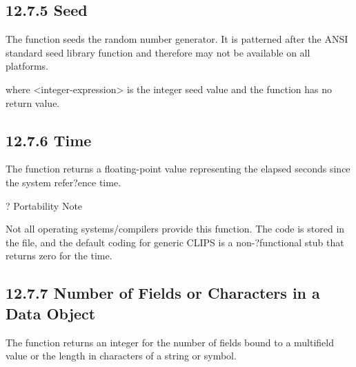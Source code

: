\documentclass[letterpaper,10pt,english]{sphinxmanual}
\begin{document}
\subsection{12.7.5 Seed}
\label{\detokenize{actions:seed}}
The  function seeds the random number generator. It is patterned
after the ANSI standard seed library function and therefore may not be
available on all platforms.


\begin{sphinxVerbatim}[commandchars=\\\{\}]
 
\end{sphinxVerbatim}

where \textless{}integer-expression\textgreater{} is the integer seed value and the function
has no return value.


\subsection{12.7.6 Time}
\label{\detokenize{actions:time}}
The  function returns a floating-point value representing the
elapsed seconds since the system refer?ence time.


\begin{sphinxVerbatim}[commandchars=\\\{\}]
\end{sphinxVerbatim}

? Portability Note

Not all operating systems/compilers provide this function. The code is
stored in the  file, and the default coding for generic
CLIPS is a non-?functional stub that returns zero for the time.


\subsection{12.7.7 Number of Fields or Characters in a Data Object}
\label{\detokenize{actions:number-of-fields-or-characters-in-a-data-object}}
The  function returns an integer for the number of fields
bound to a multifield value or the length in characters of a string or
symbol.

\end{document}

